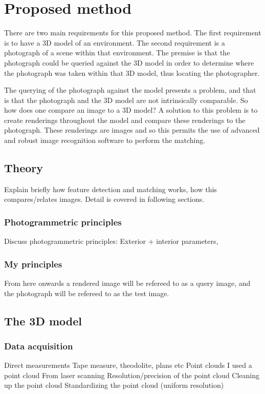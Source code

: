 \documentclass[11pt,a4paper]{article}
\begin{document}
\newpage
\section{Proposed method}
	There are two main requirements for this proposed method. The first requirement is to have a 3D model of an environment. The second requirement is a photograph of a scene within that environment. The premise is that the photograph could be queried against the 3D model in order to determine where the photograph was taken within that 3D model, thus locating the photographer.
	
	The querying of the photograph against the model presents a problem, and that is that the photograph and the 3D model are not intrinsically comparable. So how does one compare an image to a 3D model? A solution to this problem is to create renderings throughout the model and compare these renderings to the photograph. These renderings are images and so this permits the use of advanced and robust image recognition software to perform the matching.
	
	
	
	\subsection{Theory}
		Explain briefly how feature detection and matching works, how this compares/relates images. Detail is covered in following sections.
		
		\subsubsection{Photogrammetric principles}
			Discuss photogrammetric principles: Exterior + interior parameters, 
		
		\subsubsection{My principles}
			
		
		From here onwards a rendered image will be refereed to as a query image, and the photograph will be refereed to as the test image.
		
		
	\subsection{The 3D model}
		\subsubsection{Data acquisition}
			Direct measurements
				Tape measure, theodolite, plans etc
			Point clouds
				I used a point cloud
				From laser scanning
				Resolution/precision of the point cloud
				Cleaning up the point cloud
				Standardizing the point cloud (uniform resolution)
\end{document}
